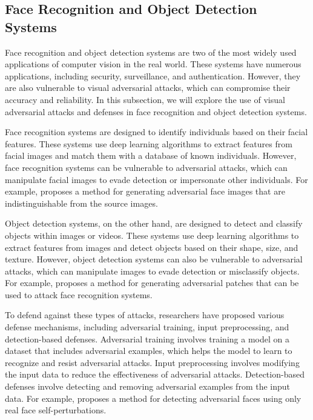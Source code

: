 \documentclass[11pt]{article}
\begin{document}
\subsection{Face Recognition and Object Detection Systems}

Face recognition and object detection systems are two of the most widely used applications of computer vision in the real world. These systems have numerous applications, including security, surveillance, and authentication. However, they are also vulnerable to visual adversarial attacks, which can compromise their accuracy and reliability. In this subsection, we will explore the use of visual adversarial attacks and defenses in face recognition and object detection systems.

Face recognition systems are designed to identify individuals based on their facial features. These systems use deep learning algorithms to extract features from facial images and match them with a database of known individuals. However, face recognition systems can be vulnerable to adversarial attacks, which can manipulate facial images to evade detection or impersonate other individuals. For example, \cite{ref124} proposes a method for generating adversarial face images that are indistinguishable from the source images.

Object detection systems, on the other hand, are designed to detect and classify objects within images or videos. These systems use deep learning algorithms to extract features from images and detect objects based on their shape, size, and texture. However, object detection systems can also be vulnerable to adversarial attacks, which can manipulate images to evade detection or misclassify objects. For example, \cite{ref125} proposes a method for generating adversarial patches that can be used to attack face recognition systems.

To defend against these types of attacks, researchers have proposed various defense mechanisms, including adversarial training, input preprocessing, and detection-based defenses. Adversarial training involves training a model on a dataset that includes adversarial examples, which helps the model to learn to recognize and resist adversarial attacks. Input preprocessing involves modifying the input data to reduce the effectiveness of adversarial attacks. Detection-based defenses involve detecting and removing adversarial examples from the input data. For example, \cite{ref126} proposes a method for detecting adversarial faces using only real face self-perturbations.
\end{document}
